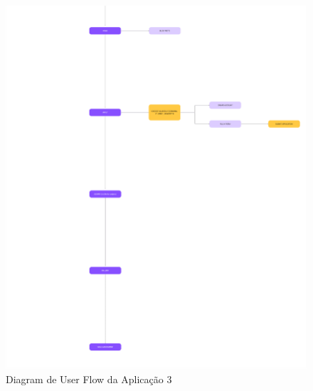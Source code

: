 \begin{figure}[h!tbp]
    \includegraphics[width=\linewidth]{appendices/a-userflowchart/BlendEd3.png}
    \caption{Diagram de User Flow da Aplicação 3}
    \label{fig:userflowchart}
\end{figure}